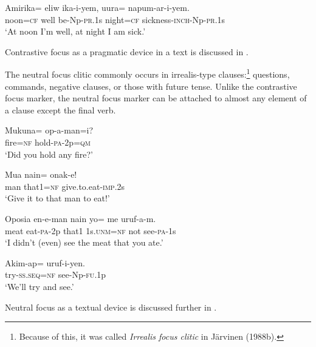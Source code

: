 \ea%
\label{ex:x784}
\gll Amirika= eliw ika-i-yem, uura= napum-ar-i-yem. \\
noon=\textsc{cf} well be-Np-\textsc{pr}.1s night=\textsc{cf} sickness-\textsc{inch}-Np-\textsc{pr}.1s\\
\glt`At noon I'm well, at night I am sick.'
\z

Contrastive focus as a pragmatic device in a text is discussed in .

The neutral focus clitic  commonly occurs in irrealis-type clauses:\footnote{Because of this, it was called \textit{Irrealis focus clitic} in J\"arvinen (1988b).} questions, commands, negative clauses, or those with future tense. Unlike the contrastive focus marker, the neutral focus marker can be attached to almost any element of a clause except the final verb. 

\ea%
\label{ex:x785}
\gll Mukuna= op-a-man=i? \\
fire=\textsc{nf} hold-\textsc{pa}-2p=\textsc{qm}\\
\glt`Did you hold any fire?'
\z

\ea%
\label{ex:x786}
\gll Mua nain= onak-e! \\
man that1=\textsc{nf} give.to.eat-\textsc{imp}.2s\\
\glt`Give it to that man to eat!'
\z

\ea%
\label{ex:x787}
\gll Oposia en-e-man nain yo= me uruf-a-m. \\
meat eat-\textsc{pa}-2p that1 1s.\textsc{unm}=\textsc{nf} not see-\textsc{pa}-1s\\
\glt`I didn't (even) see the meat that you ate.'
\z

\ea%
\label{ex:x788}
\gll Akim-ap= uruf-i-yen. \\
try-\textsc{ss}.\textsc{seq}=\textsc{nf} see-Np-\textsc{fu}.1p\\
\glt`We'll try and see.'
\z

Neutral focus as a textual device is discussed further in .

